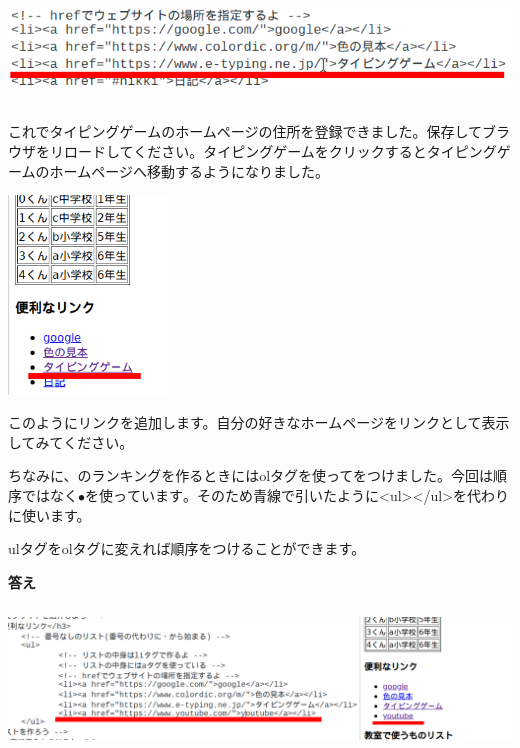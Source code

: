 \documentclass[a4paper,12pt]{jarticle}
\begin{document}
\centering
\includegraphics[width=15.953cm,height=2.746cm]{textbook-img200.png}

\bigskip
\flushleft

これでタイピングゲームのホームページの住所を登録できました。保存してブラウザをリロードしてください。タイピングゲームをクリックするとタイピングゲームのホームページへ移動するようになりました。


\bigskip
\centering
\includegraphics[width=4.235cm,height=5.276cm]{textbook-img201.png}


\flushleft
このようにリンクを追加します。自分の好きなホームページをリンクとして表示してみてください。

ちなみに、のランキングを作るときにはolタグを使ってをつけました。今回は順序ではなく${\bullet}を使っています。そのため青線で引いたように${\textless}ul{\textgreater}{\textless}/ul{\textgreater}を代わりに使います。

ulタグをolタグに変えれば順序をつけることができます。


\bigskip

\textbf{答え}

\centering
\includegraphics[width=14.617cm,height=3.821cm]{textbook-img202.png}

\flushleft
{}\theQuestion\label{Q:hasAnswer04-10}
\end{document}
